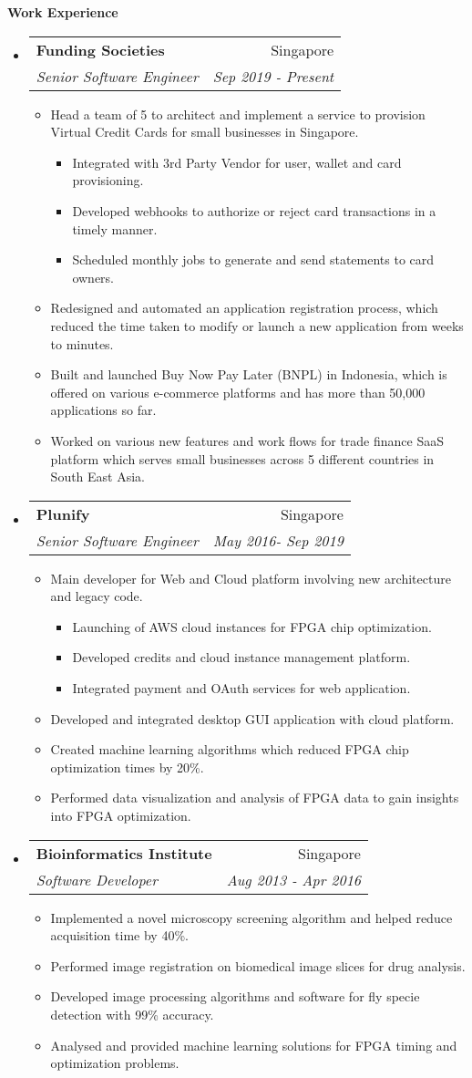 \documentclass[letterpaper,11pt]{article}
\makeatletter
\newcommand{\resitem}[1]{\item #1 \vspace{-2pt}}
\newcommand{\resheading}[1]{{\large \colorbox{mygrey}{\begin{minipage}{\textwidth}{\textbf{#1 \vphantom{p\^{E}}}}\end{minipage}}}}
\newcommand{\ressubheading}[4]{
\begin{tabular*}{7.0in}{l@{\extracolsep{\fill}}r}
		\textbf{#1} & #2 \\
		\textit{#3} & \textit{#4} \\
\end{tabular*}\vspace{-6pt}}
\makeatother
\begin{document}
\resheading{Work Experience}
\begin{itemize}
\item
	\ressubheading{Funding Societies}{Singapore}{Senior Software Engineer}{Sep 2019 - Present}

	\begin{itemize}
		\resitem{Head a team of 5 to architect and implement a service to provision Virtual Credit Cards for small businesses in Singapore.}
		 \begin{itemize}
			\resitem{Integrated with 3rd Party Vendor for user,  wallet and card provisioning.}
			\resitem{Developed webhooks to authorize or reject card transactions in a timely manner.}
			\resitem{Scheduled monthly jobs to generate and send statements to card owners.}
		\end{itemize}
		\resitem{Redesigned and automated an application registration process,  which reduced the time taken to modify or launch a new application from weeks to minutes.}
		\resitem{Built and launched Buy Now Pay Later (BNPL) in Indonesia, which is offered on various e-commerce platforms and has more than 50,000 applications so far.}
		\resitem{Worked on various new features and work flows for trade finance SaaS platform which serves small businesses across 5 different countries in South East Asia.}
	\end{itemize}


\item
	\ressubheading{Plunify}{Singapore}{Senior Software Engineer}{May 2016- Sep 2019}
	\begin{itemize}
	    \resitem{Main developer for Web and Cloud platform involving new architecture and legacy code.}
	    \begin{itemize}
			\resitem{Launching of AWS cloud instances for FPGA chip optimization.}
			\resitem{Developed credits and cloud instance management platform.}
			\resitem{Integrated payment and OAuth services for web application.}
	    \end{itemize}
	    \resitem{Developed and integrated desktop GUI application with cloud platform.}
		\resitem{Created machine learning algorithms which reduced FPGA chip optimization times by 20\%.}
		\resitem{Performed data visualization and analysis of FPGA data to gain insights into FPGA optimization.}
	\end{itemize}


\item
	\ressubheading{Bioinformatics Institute}{Singapore}{Software Developer}{Aug 2013 - Apr 2016}
	\begin{itemize}
		\resitem{Implemented a novel microscopy screening algorithm and helped reduce acquisition time by 40\%.}
		\resitem{Performed image registration on biomedical image slices for drug analysis.}
		\resitem{Developed image processing algorithms and	 software for fly specie detection with 99\% accuracy.}
		\resitem{Analysed and provided machine learning solutions for FPGA timing and optimization problems.}
	\end{itemize}


\end{itemize}
\end{document}
